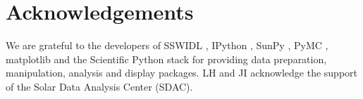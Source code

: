 \section{Acknowledgements}
We are grateful to the developers of SSWIDL \citep{ssw}, IPython
\citep{ipython}, SunPy \citep{mumford-proc-scipy-2013}, PyMC
\citep{pymc}, matplotlib \citep{Hunter:2007:matplotlib} and the
Scientific Python stack for providing data preparation, manipulation,
analysis and display packages.  LH and JI acknowledge the support of
the Solar Data Analysis Center (SDAC).

